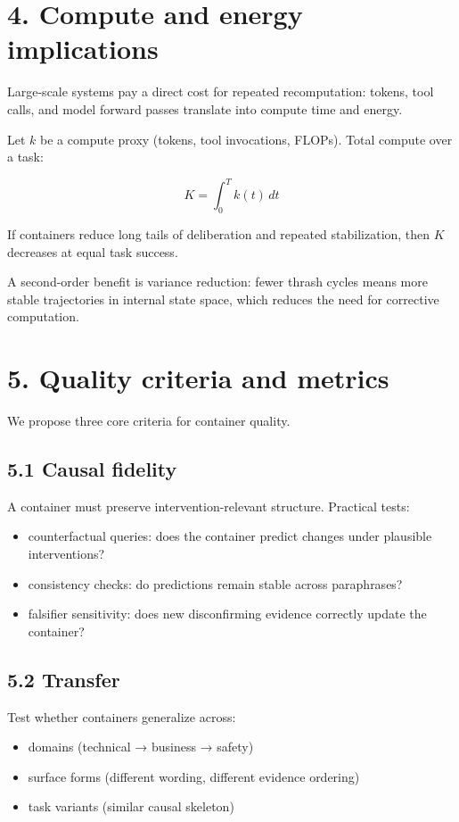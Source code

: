 \documentclass[11pt]{article}
\begin{document}
\section*{4. Compute and energy implications}
Large-scale systems pay a direct cost for repeated recomputation: tokens, tool calls, and model forward passes translate into compute time and energy.

Let \(k\) be a compute proxy (tokens, tool invocations, FLOPs). Total compute over a task:

\[
K = \int_0^T k(t)\,dt
\]

If containers reduce long tails of deliberation and repeated stabilization, then \(K\) decreases at equal task success.

A second-order benefit is variance reduction: fewer thrash cycles means more stable trajectories in internal state space, which reduces the need for corrective computation.

\section*{5. Quality criteria and metrics}
We propose three core criteria for container quality.

\subsection*{5.1 Causal fidelity}
A container must preserve intervention-relevant structure. Practical tests:

\begin{itemize}
\item counterfactual queries: does the container predict changes under plausible interventions?
\item consistency checks: do predictions remain stable across paraphrases?
\item falsifier sensitivity: does new disconfirming evidence correctly update the container?
\end{itemize}

\subsection*{5.2 Transfer}
Test whether containers generalize across:

\begin{itemize}
\item domains (technical → business → safety)
\item surface forms (different wording, different evidence ordering)
\item task variants (similar causal skeleton)
\end{itemize}
\end{document}
